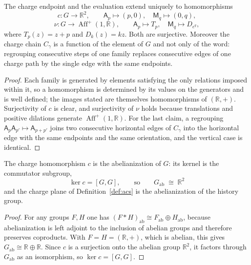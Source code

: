 \begin{proposition}
\label{prop:p0-history-homomorphisms}
The charge endpoint and the evaluation extend uniquely to homomorphisms
\[
  c:G\longrightarrow\mathbb R^2,
  \qquad
  \mathsf A_p\longmapsto(p,0),\quad \mathsf M_q\longmapsto(0,q),
\]
\[
  \nu:G\longrightarrow\operatorname{Aff}^{+}(1,\mathbb R),
  \qquad
  \mathsf A_p\longmapsto T_p,\quad \mathsf M_q\longmapsto D_{e^{q}},
\]
where $T_p(z)=z+p$ and $D_k(z)=kz$.  Both are surjective.  Moreover the charge
chain $C_\gamma$ is a function of the element of $G$ and not only of the word:
regrouping consecutive steps of one family replaces consecutive edges of one
charge path by the single edge with the same endpoints.
\end{proposition}

\begin{proof}
Each family is generated by elements satisfying the only relations imposed within
it, so a homomorphism is determined by its values on the generators and is
well defined; the images stated are themselves homomorphisms of $(\mathbb R,+)$.
Surjectivity of $c$ is clear, and surjectivity of $\nu$ holds because
translations and positive dilations generate
$\operatorname{Aff}^{+}(1,\mathbb R)$.  For the last claim, a regrouping
$\mathsf A_p\mathsf A_{p'}\mapsto\mathsf A_{p+p'}$ joins two consecutive
horizontal edges of $C_\gamma$ into the horizontal edge with the same endpoints
and the same orientation, and the vertical case is identical.
\end{proof}

\begin{proposition}
\label{prop:p0-acs-is-abelianization}
The charge homomorphism $c$ is the abelianization of $G$: its kernel is the
commutator subgroup,
\[
  \ker c=[G,G],
  \qquad\text{so}\qquad
  G_{\mathrm{ab}}\;\cong\;\mathbb R^2
\]
and the charge plane of Definition~\ref{def:acs} is the abelianization of the
history group.
\end{proposition}

\begin{proof}
For any groups $F,H$ one has
$(F*H)_{\mathrm{ab}}\cong F_{\mathrm{ab}}\oplus H_{\mathrm{ab}}$, because
abelianization is left adjoint to the inclusion of abelian groups and therefore
preserves coproducts.  With $F=H=(\mathbb R,+)$, which is abelian, this gives
$G_{\mathrm{ab}}\cong\mathbb R\oplus\mathbb R$.  Since $c$ is a surjection onto
the abelian group $\mathbb R^2$, it factors through $G_{\mathrm{ab}}$ as an
isomorphism, so $\ker c=[G,G]$.
\end{proof}

